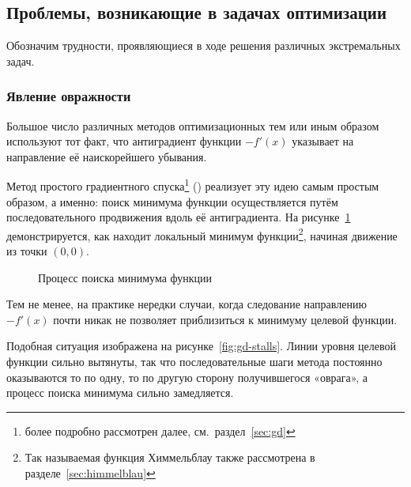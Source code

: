 \subsection{Проблемы, возникающие в задачах оптимизации}
Обозначим трудности, проявляющиеся в ходе решения различных
экстремальных задач.

\subsubsection{Явление овражности}
\label{sec:problems-ill}

Большое число различных методов оптимизационных тем или иным образом
используют тот факт, что антиградиент функции $-f'(x)$ указывает на
направление её наискорейшего убывания.

Метод простого градиентного спуска\footnote{\gd{} более подробно
  рассмотрен далее, см. раздел \ref{sec:gd}} (\gd{}) реализует эту
идею самым простым образом, а именно: поиск минимума функции
осуществляется путём последовательного продвижения вдоль её
антиградиента. На рисунке \ref{fig:gd-works} демонстрируется, как
\gd{} находит локальный минимум функции\footnote{Так называемая
  функция Химмельблау также рассмотрена в
  разделе \ref{sec:himmelblau}}, начиная движение из точки $(0, 0)$.

\begin{figure}[!thb]
  \centering
  \caption{Процесс поиска минимума функции}
  \label{fig:gd-works}
\end{figure}

Тем не менее, на практике нередки случаи, когда следование направлению
$-f'(x)$ почти никак не позволяет приблизиться к минимуму целевой
функции.

Подобная ситуация изображена на рисунке \ref{fig:gd-stalls}. Линии
уровня целевой функции сильно вытянуты, так что последовательные шаги
метода \gd{} постоянно оказываются то по одну, то по другую сторону
получившегося «оврага», а процесс поиска минимума сильно замедляется.

